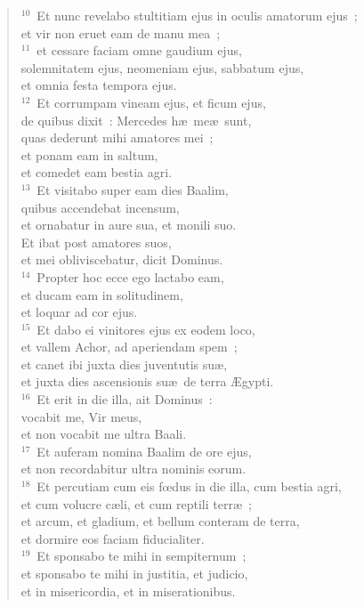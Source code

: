 \begin{verse}
${}^{10}$~Et nunc revelabo stultitiam ejus in oculis amatorum ejus~;\\ et vir non eruet eam de manu mea~;\\
${}^{11}$~et cessare faciam omne gaudium ejus,\\ solemnitatem ejus, neomeniam ejus, sabbatum ejus,\\ et omnia festa tempora ejus.\\
${}^{12}$~Et corrumpam vineam ejus, et ficum ejus,\\ de quibus dixit~: Mercedes h\ae\ me\ae\ sunt,\\ quas dederunt mihi amatores mei~;\\ et ponam eam in saltum,\\ et comedet eam bestia agri.\\
${}^{13}$~Et visitabo super eam dies Baalim,\\ quibus accendebat incensum,\\ et ornabatur in aure sua, et monili suo.\\ Et ibat post amatores suos,\\ et mei obliviscebatur, dicit Dominus.\\
${}^{14}$~Propter hoc ecce ego lactabo eam,\\ et ducam eam in solitudinem,\\ et loquar ad cor ejus.\\
${}^{15}$~Et dabo ei vinitores ejus ex eodem loco,\\ et vallem Achor, ad aperiendam spem~;\\ et canet ibi juxta dies juventutis su\ae ,\\ et juxta dies ascensionis su\ae\ de terra \AE gypti.\\
${}^{16}$~Et erit in die illa, ait Dominus~:\\ vocabit me, Vir meus,\\ et non vocabit me ultra Baali.\\
${}^{17}$~Et auferam nomina Baalim de ore ejus,\\ et non recordabitur ultra nominis eorum.\\
${}^{18}$~Et percutiam cum eis fœdus in die illa, cum bestia agri,\\ et cum volucre c\ae li, et cum reptili terr\ae~;\\ et arcum, et gladium, et bellum conteram de terra,\\ et dormire eos faciam fiducialiter.\\
${}^{19}$~Et sponsabo te mihi in sempiternum~;\\ et sponsabo te mihi in justitia, et judicio,\\ et in misericordia, et in miserationibus.\\

\end{verse}
